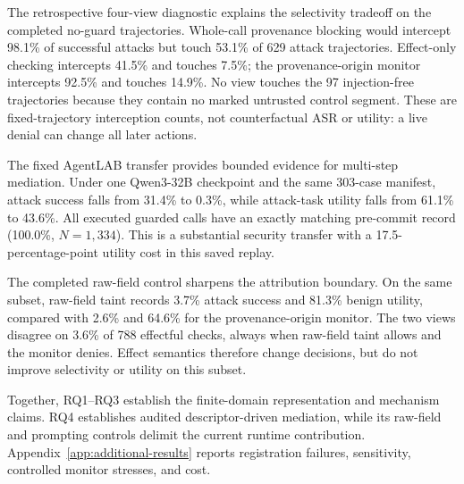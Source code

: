 The retrospective four-view diagnostic explains the selectivity tradeoff on
the completed no-guard trajectories.  Whole-call provenance blocking would
intercept 98.1\% of successful attacks but touch 53.1\% of 629 attack
trajectories.  Effect-only checking intercepts 41.5\% and touches 7.5\%; the
provenance-origin monitor intercepts 92.5\% and touches 14.9\%.  No view touches
the 97 injection-free trajectories because they contain no marked
untrusted control segment.  These are fixed-trajectory interception counts,
not counterfactual ASR or utility: a live denial can change all later actions.

The fixed AgentLAB transfer provides bounded evidence for multi-step mediation.
Under one Qwen3-32B checkpoint and the same 303-case manifest, attack success
falls from 31.4\% to 0.3\%, while attack-task utility falls from 61.1\% to
43.6\%.  All executed guarded calls have an exactly matching pre-commit record
(100.0\%, $N=1{,}334$).  This is a substantial security transfer with
a 17.5-percentage-point utility cost in this saved replay.

The completed raw-field control sharpens the attribution boundary.  On the
same subset, raw-field taint records 3.7\% attack success and 81.3\% benign
utility, compared with 2.6\% and 64.6\% for the provenance-origin monitor.  The
two views disagree on 3.6\% of 788 effectful checks, always when raw-field taint
allows and the monitor denies.  Effect semantics therefore change decisions,
but do not improve selectivity or utility on this subset.



Together, RQ1--RQ3 establish the finite-domain representation and mechanism
claims.  RQ4 establishes audited descriptor-driven mediation, while its
raw-field and prompting controls delimit the current runtime contribution.
Appendix~\ref{app:additional-results} reports registration failures,
sensitivity, controlled monitor stresses, and cost.
